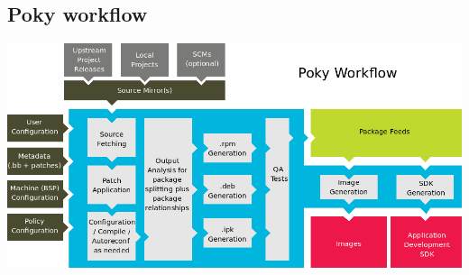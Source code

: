 \documentclass{article}
\begin{document}
\subsection{Poky workflow}

\begin{center}
  \includegraphics[scale=0.60]{./resources/img/yocto-environment.png}
\end{center}
\end{document}
